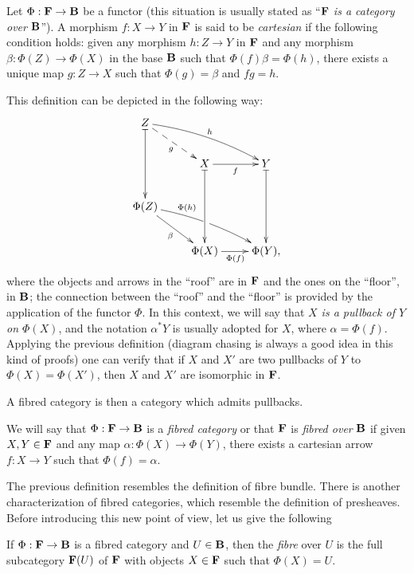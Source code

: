 \begin{defi}
Let $\Phi:{\bf F}\to {\bf B}$ be a functor (this situation is usually stated as ``${\bf F}$ \emph{is a category over} ${\bf B}$''). A morphism $f:X\to Y$ in ${\bf F}$ is said to be \emph{cartesian} if the following condition holds: given any morphism $h:Z\to Y$ in ${\bf F}$ and any morphism $\beta :\Phi (Z)\to \Phi (X)$ in the base ${\bf B}$ such that $\Phi (f)\beta =\Phi (h)$, there exists a unique map $g:Z\to X$ such that $\Phi (g)=\beta$ and $fg=h$.
\end{defi}

This definition can be depicted in the following way:
$$
\xymatrix{
   Z\ar@{|->}[dd] \ar@{-->}[rd]_{g} \ar@/^/[rrd]^{h} & & \\
   & X\ar@{|->}[dd]\ar[r]_{f} & Y\ar@{|->}[dd] \\
   \Phi (Z) \ar[rd]_{\beta}\ar@/^/[rrd] ^(.3){\Phi (h)} |(.487)\hole \\
   & \Phi (X) \ar[r]_{\Phi (f)} & \Phi (Y),}
$$
where the objects and arrows in the ``roof'' are in ${\bf F}$ and the ones on the ``floor'', in ${\bf B}$; the connection between the ``roof'' and the ``floor'' is provided by the application of the functor $\Phi$. In this context, we will say that \emph{$X$ is a pullback of $Y$ on $\Phi (X)$}, and the notation $\alpha^*Y$ is usually adopted for $X$, where $\alpha =\Phi (f)$. Applying the previous definition (diagram chasing is always a good idea in this kind of proofs) one can verify that if $X$ and $X'$ are two pullbacks of $Y$ to $\Phi (X)=\Phi (X')$, then $X$ and $X'$ are isomorphic in ${\bf F}$.

A fibred category is then a category which admits pullbacks.

\begin{defi}
We will say that $\Phi:{\bf F}\to {\bf B}$ is a \emph{fibred category} or that ${\bf F}$ is \emph{fibred over} ${\bf B}$ if given $X,Y\in {\bf F}$ and any map $\alpha :\Phi (X)\to \Phi (Y)$, there exists a cartesian arrow $f:X\to Y$ such that $\Phi (f)=\alpha$.
\end{defi}

The previous definition resembles the definition of fibre bundle. There is another characterization of fibred categories, which resemble the definition of presheaves. Before introducing this new point of view, let us give the following

\begin{defi}
If $\Phi :{\bf F}\to {\bf B}$ is a fibred category and $U\in {\bf B}$, then the \emph{fibre} over $U$ is the full subcategory ${\bf F}(U)$ of ${\bf F}$ with objects $X\in {\bf F}$ such that $\Phi (X)=U$.
\end{defi}

